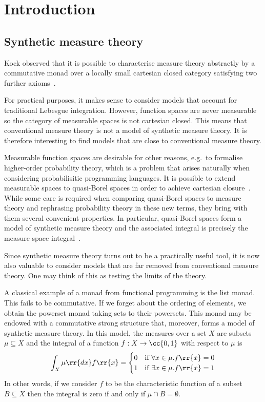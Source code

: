 \chapter{Introduction}\label{sec:introduction}

\section{Synthetic measure theory}

Kock observed that it is possible to characterise measure theory abstractly by a commutative monad
over a locally small cartesian closed category satisfying two further axioms~\cite{kock2011}.

For practical purposes, it makes sense to consider models that account for traditional Lebesgue integration.
However, function spaces are never measurable~\cite{aumann1961} so the category of measurable
spaces is not cartesian closed. This means that conventional measure theory is not a model of synthetic measure theory.
It is therefore interesting to find models that are close to conventional measure theory.

Measurable function spaces are desirable for other reasons, e.g.\ to formalise higher-order probability
theory, which is a problem that arises naturally when considering probabilisitic programming languages.
It is possible to extend measurable spaces to quasi-Borel spaces in order to achieve cartesian closure~\cite{heunen2017}. While some care is required when comparing quasi-Borel spaces to measure theory
and rephrasing probability theory in these new terms, they bring with them several convenient properties.
In particular, quasi-Borel spaces form a model of synthetic measure theory and the associated integral
is precisely the measure space integral~\cite{scibor2018}.

Since synthetic measure theory turns out to be a practically useful tool, it is now also
valuable to consider models that are far removed from conventional measure theory. One
may think of this as testing the limits of the theory.

A classical example of a monad from functional programming is the list monad.
This fails to be commutative. If we forget about the ordering of elements, we
obtain the powerset monad taking sets to their powersets. This monad may be
endowed with a commutative strong structure that, moreover, forms a model of synthetic
measure theory. In this model, the measures over a set $X$ are subsets
$\mu\subseteq X$ and the integral of a function $f:X\to\cc{0,1}$ with respect
to $\mu$ is
\begin{align*}
  \int_X \mu\rr{dx}f\rr{x} = \begin{cases}
    0 & \text{if }\forall  x\in \mu. f\rr{x}=0 \\
    1 & \text{if }\exists  x\in \mu. f\rr{x}=1
  \end{cases}
\end{align*}
In other words, if we consider $f$ to be the characteristic function of a subset $B\subseteq X$
then the integral is zero if and only if $\mu\cap B=\emptyset$.

